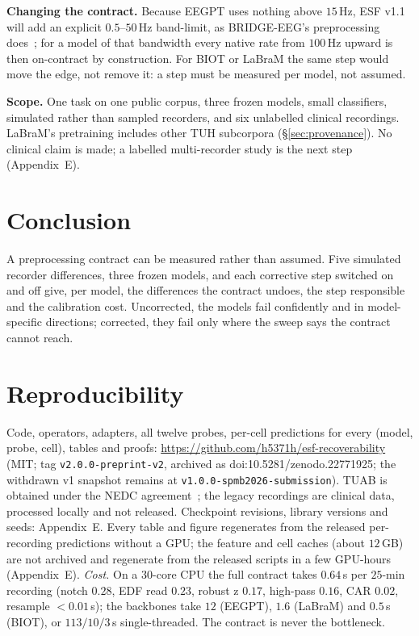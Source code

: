 \documentclass[conference]{IEEEtran}
\begin{document}
\textbf{Changing the contract.} Because EEGPT uses nothing above
$15$\,Hz, ESF v1.1 will add an explicit $0.5$--$50$\,Hz band-limit,
as BRIDGE-EEG's preprocessing does~\cite{chowdhury2026bridge}; for a
model of that bandwidth every native rate from $100$\,Hz upward is
then on-contract by construction. For BIOT or LaBraM the same step
would move the edge, not remove it: a step must be measured per model,
not assumed.

\textbf{Scope.} One task on one public corpus, three frozen models,
small classifiers, simulated rather than sampled recorders, and six
unlabelled clinical recordings. LaBraM's pretraining includes other
TUH subcorpora (\S\ref{sec:provenance}). No clinical claim is made; a
labelled multi-recorder study is the next step (Appendix~E).

\section{Conclusion}
\label{sec:conclusion}
A preprocessing contract can be measured rather than assumed. Five
simulated recorder differences, three frozen models, and each
corrective step switched on and off give, per model, the differences
the contract undoes, the step responsible and the calibration cost.
Uncorrected, the models fail confidently and in model-specific
directions; corrected, they fail only where the sweep says the
contract cannot reach.

\section*{Reproducibility}
\label{sec:repro}
Code, operators, adapters, all twelve probes, per-cell predictions
for every (model, probe, cell), tables and proofs:
\url{https://github.com/h5371h/esf-recoverability} (MIT; tag
\texttt{v2.0.0-preprint-v2}, archived as doi:10.5281/zenodo.22771925; the
withdrawn v1
snapshot remains at \texttt{v1.0.0-spmb2026-submission}). TUAB is
obtained under the NEDC agreement~\cite{lopez2015abnormal}; the legacy
recordings are clinical data, processed locally and not released.
Checkpoint revisions, library versions and seeds: Appendix~E. Every
table and figure regenerates from the released per-recording
predictions without a GPU; the feature and cell caches (about
$12$\,GB) are not archived and regenerate from the released scripts
in a few GPU-hours (Appendix~E).
\textit{Cost.} On a $30$-core CPU the full contract takes $0.64$\,s per
$25$-min recording (notch $0.28$, EDF read $0.23$, robust z $0.17$,
high-pass $0.16$, CAR $0.02$, resample $<0.01$\,s); the backbones take
$12$ (EEGPT), $1.6$ (LaBraM) and $0.5$\,s (BIOT), or $113/10/3$\,s
single-threaded. The contract is never the bottleneck.
\end{document}

